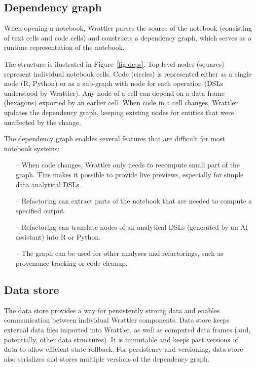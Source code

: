 \documentclass[sigplan,preprint,10pt]{acmart}\settopmatter{printfolios=true,printccs=false,printacmref=false}
\theoremstyle{plain}
\theoremstyle{definition}
\begin{document}
\subsection{Dependency graph}

When opening a notebook, Wrattler parses the source of the notebook (consisting of text cells and 
code cells) and constructs a dependency graph, which serves as a runtime representation of the
notebook. 

The structure is ilustrated in Figure~\ref{fig:deps}. Top-level nodes (squares) represent
individual notebook cells. Code (circles) is represented either as a single node (R, Python) or as 
a sub-graph with node for each operation (DSLs understood by Wrattler). Any node of a cell can 
depend on a data frame (hexagons) exported by an earlier cell. 
When code in a cell changes, Wrattler updates the dependency graph, keeping existing
nodes for entities that were unaffected by the change. 

The dependency graph enables several features that are difficult for most notebook systems:
%
\begin{itemize}
\item[--] When code changes, Wrattler only needs to recompute small part of the graph.
  This makes it possible to provide live previews, especially for simple data analytical DSLs.
\vspace{-0.85em}
\item[--] Refactoring can extract parts of the notebook that
  are needed to compute a specified output.
\vspace{0.25em}
\item[--] Refactoring can translate nodes of an analytical DSLs (generated by an AI assistant) into R or Python.
\vspace{0.25em}
\item[--] The graph can be used for other analyses and refactorings, such as provenance tracking
  or code cleanup.
\end{itemize}

\subsection{Data store}

The data store provides a way for persistently stroing data and enables communication between 
individual Wrattler components. Data store keeps external data files imported into Wrattler,
as well as computed data frames (and, potentially, other data structures). It is immutable 
and keeps past versions of data to allow efficient state rollback. For persistency and versioning, 
data store also serializes and stores multiple versions of the dependency graph.
\end{document}
